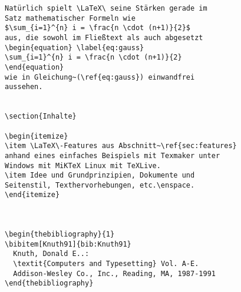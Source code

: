 \documentclass[10pt,a4paper]{article}
\begin{document}
\begin{minipage}{77mm}
\begin{verbatim}
Natürlich spielt \LaTeX\ seine Stärken gerade im 
Satz mathematischer Formeln wie 
$\sum_{i=1}^{n} i = \frac{n \cdot (n+1)}{2}$ 
aus, die sowohl im Fließtext als auch abgesetzt 
\begin{equation} \label{eq:gauss}
\sum_{i=1}^{n} i = \frac{n \cdot (n+1)}{2}
\end{equation}
wie in Gleichung~(\ref{eq:gauss}) einwandfrei 
aussehen.


\section{Inhalte}

\begin{itemize}
\item \LaTeX\-Features aus Abschnitt~\ref{sec:features} 
anhand eines einfaches Beispiels mit Texmaker unter 
Windows mit MiKTeX Linux mit TeXLive.
\item Idee und Grundprinzipien, Dokumente und 
Seitenstil, Texthervorhebungen, etc.\enspace.
\end{itemize}



\begin{thebibliography}{1}
\bibitem[Knuth91]{bib:Knuth91}
  Knuth, Donald E..:
  \textit{Computers and Typesetting} Vol. A-E.
  Addison-Wesley Co., Inc., Reading, MA, 1987-1991
\end{thebibliography}

\end{verbatim}
\end{minipage}
\end{document}

